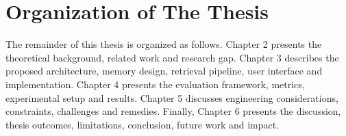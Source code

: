 \section{Organization of The Thesis}
The remainder of this thesis is organized as follows. Chapter 2 presents the theoretical background, related work and research gap. Chapter 3 describes the proposed architecture, memory design, retrieval pipeline, user interface and implementation. Chapter 4 presents the evaluation framework, metrics, experimental setup and results. Chapter 5 discusses engineering considerations, constraints, challenges and remedies. Finally, Chapter 6 presents the discussion, thesis outcomes, limitations, conclusion, future work and impact.
